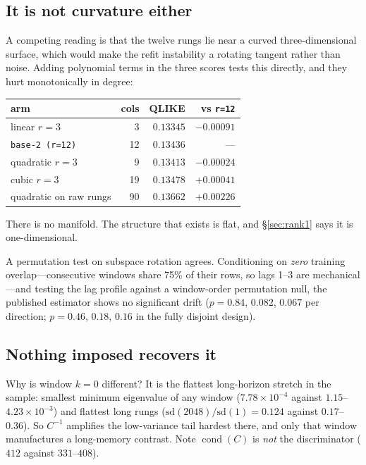 \documentclass[11pt,a4paper]{article}
\begin{document}
\subsection{It is not curvature either}
\label{sec:curvature}

A competing reading is that the twelve rungs lie near a curved
three-dimensional surface, which would make the refit instability a rotating
tangent rather than noise. Adding polynomial terms in the three scores tests
this directly, and they hurt monotonically in degree:

\begin{table}[h]
\centering
\begin{tabular}{lrrr}
\toprule
arm & cols & QLIKE & vs \texttt{r=12} \\
\midrule
linear $r{=}3$   & 3  & $0.13345$ & $-0.00091$ \\
\texttt{base-2 (r=12)} & 12 & $0.13436$ & --- \\
quadratic $r{=}3$ & 9  & $0.13413$ & $-0.00024$ \\
cubic $r{=}3$     & 19 & $0.13478$ & $+0.00041$ \\
quadratic on raw rungs & 90 & $0.13662$ & $+0.00226$ \\
\bottomrule
\end{tabular}
\end{table}

\noindent
There is no manifold. The structure that exists is flat, and
\S\ref{sec:rank1} says it is one-dimensional.

A permutation test on subspace rotation agrees. Conditioning on \emph{zero}
training overlap---consecutive windows share 75\% of their rows, so lags 1--3
are mechanical---and testing the lag profile against a window-order permutation
null, the published estimator shows no significant drift ($p=0.84$, $0.082$,
$0.067$ per direction; $p=0.46$, $0.18$, $0.16$ in the fully disjoint design).

\subsection{Nothing imposed recovers it}
\label{sec:whyk0}

Why is window $k{=}0$ different? It is the flattest long-horizon stretch in the
sample: smallest minimum eigenvalue of any window ($7.78\times10^{-4}$ against
$1.15$--$4.23\times10^{-3}$) and flattest long rungs
($\mathrm{sd}(2048)/\mathrm{sd}(1) = 0.124$ against $0.17$--$0.36$). So
$C^{-1}$ amplifies the low-variance tail hardest there, and only that window
manufactures a long-memory contrast. Note $\operatorname{cond}(C)$ is
\emph{not} the discriminator ($412$ against $331$--$408$).
\end{document}
